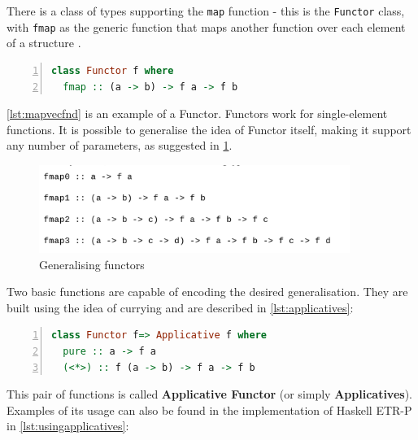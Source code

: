 There is a class of types supporting the \lstinline!map! function - this is the \lstinline!Functor! class, with \lstinline!fmap! as the generic function that maps another function over each element of a structure \cite{hutton2016programming}.

\begin{lstlisting}[language=Haskell, numbers=left, caption={Functor class}, captionpos=b, label={lst:functorfmap}]
class Functor f where
  fmap :: (a -> b) -> f a -> f b
\end{lstlisting}

\ref{lst:mapvecfnd} is an example of a Functor. Functors work for single-element functions. It is possible to generalise the idea of Functor itself, making it support any number of parameters, as suggested in \cref{genfunctors}.

\begin{figure}[H]
   \centering
   \includegraphics[width=0.9\textwidth]{img/functorapplicative.png}
   \caption{Generalising functors}
   \label{genfunctors}
\end{figure}
\cite{hutton2016programming}

Two basic functions are capable of encoding the desired generalisation. They are built using the idea of currying and are described in  \cref{lst:applicatives}:


\begin{lstlisting}[language=Haskell, numbers=left, caption={Applicatives}, captionpos=b, label={lst:applicatives}]
class Functor f=> Applicative f where
  pure :: a -> f a
  (<*>) :: f (a -> b) -> f a -> f b 
\end{lstlisting}

This pair of functions is called \textbf{Applicative Functor} (or simply \textbf{Applicatives}). Examples of its usage can also be found in the implementation of Haskell ETR-P in \cref{lst:usingapplicatives}:

